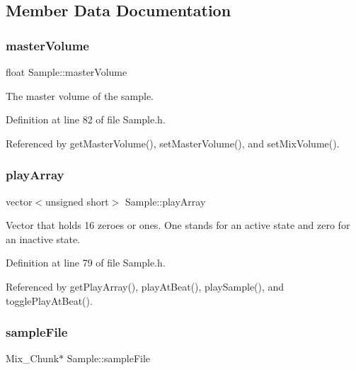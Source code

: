 \subsection{Member Data Documentation}
\mbox{\label{class_sample_a2d48ff8caf8425c37cf74130afb0c87a}} 
\subsubsection{\texorpdfstring{master\+Volume}{masterVolume}}
{\footnotesize\ttfamily float Sample\+::master\+Volume\hspace{0.3cm}{\ttfamily [private]}}



The master volume of the sample. 



Definition at line 82 of file Sample.\+h.



Referenced by get\+Master\+Volume(), set\+Master\+Volume(), and set\+Mix\+Volume().

\mbox{\label{class_sample_a824014df7294cb94445e7ee89cc15987}} 
\subsubsection{\texorpdfstring{play\+Array}{playArray}}
{\footnotesize\ttfamily vector$<$unsigned short$>$ Sample\+::play\+Array\hspace{0.3cm}{\ttfamily [private]}}



Vector that holds 16 zeroes or ones. One stands for an active state and zero for an inactive state. 



Definition at line 79 of file Sample.\+h.



Referenced by get\+Play\+Array(), play\+At\+Beat(), play\+Sample(), and toggle\+Play\+At\+Beat().

\mbox{\label{class_sample_ae158342c8d18a05de1c85802f7cfbd2a}} 
\subsubsection{\texorpdfstring{sample\+File}{sampleFile}}
{\footnotesize\ttfamily Mix\+\_\+\+Chunk$\ast$ Sample\+::sample\+File\hspace{0.3cm}{\ttfamily [private]}}




